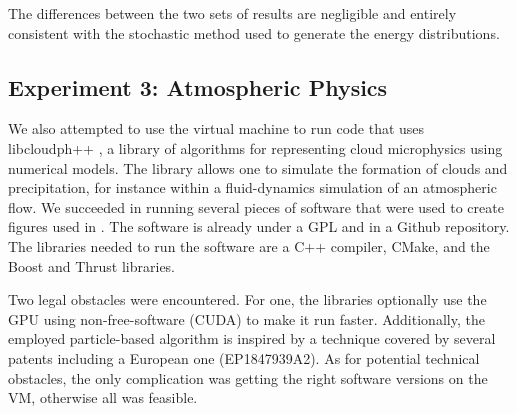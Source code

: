 The differences between the two sets of results are negligible and entirely consistent with the stochastic method used to generate the energy distributions.


 
\subsection*{Experiment 3: Atmospheric Physics}

We also attempted to use the virtual machine to run code that uses libcloudph++ \cite{arabas2013libcloud}, a library of algorithms
for representing cloud microphysics using numerical models. The library allows one to simulate the formation of clouds and precipitation, for instance within a fluid-dynamics simulation of an atmospheric flow. We succeeded in running several pieces of software that were used to create figures used in \cite{arabas2013libcloud}. The software is already under a GPL and in a Github repository. The libraries needed to run the software are a C++ compiler, CMake, and the Boost and Thrust libraries.

Two legal obstacles were encountered. For one, the libraries optionally use the GPU using non-free-software (CUDA) to make it run faster. Additionally, the employed particle-based algorithm is inspired by a technique covered by several patents including a European one (EP1847939A2). As for potential technical obstacles, the only complication was getting the right software versions on the VM, otherwise all was feasible.
